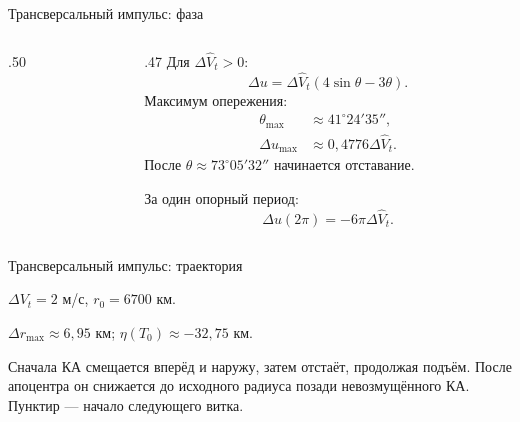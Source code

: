 \documentclass[11pt,aspectratio=169,t]{beamer}
\newcommand{\eqcompact}{\fontsize{10}{12}\selectfont}
\begin{document}
\begin{frame}{Трансверсальный импульс: фаза}
\relax
\begin{columns}[T,onlytextwidth]
\begin{column}{.50\textwidth}
\centering
\end{column}
\begin{column}{.47\textwidth}
Для $\Delta\widehat V_t>0$:
{\eqcompact
\setlength{\abovedisplayskip}{3pt}\setlength{\belowdisplayskip}{3pt}
\setlength{\abovedisplayshortskip}{2pt}\setlength{\belowdisplayshortskip}{2pt}
\[
 \Delta u={\Delta\widehat V_t}(4\sin\theta-3\theta).
\]
}
Максимум опережения:
{\eqcompact
\setlength{\abovedisplayskip}{3pt}\setlength{\belowdisplayskip}{3pt}
\setlength{\abovedisplayshortskip}{2pt}\setlength{\belowdisplayshortskip}{2pt}
\[
 \begin{aligned}
 \theta_{\max}&\approx41^\circ24'35'',\\[3pt]
 \Delta u_{\max}&\approx0{,}4776\Delta\widehat V_t.
 \end{aligned}
\]
}
После $\theta\approx73^\circ05'32''$ начинается отставание.
\smallskip

За один опорный период:
{\eqcompact
\setlength{\abovedisplayskip}{3pt}\setlength{\belowdisplayskip}{3pt}
\setlength{\abovedisplayshortskip}{2pt}\setlength{\belowdisplayshortskip}{2pt}
\[
 \Delta u(2\pi)=-6\pi {\Delta\widehat V_t}.
\]
}
\end{column}
\end{columns}
\end{frame}

\begin{frame}{Трансверсальный импульс: траектория}
\relax
\centering\par
\raggedright
$\Delta V_t=2$ м/с, $r_0=6700$ км.
\smallskip

$\Delta r_{\max}\approx6{,}95$ км;
$\eta(T_0)\approx-32{,}75$ км.
\smallskip

{\justifying
Сначала КА смещается вперёд и наружу, затем отстаёт, продолжая подъём. После апоцентра он снижается до исходного радиуса позади невозмущённого КА. Пунктир --- начало следующего витка.\par}
\end{frame}
\end{document}
